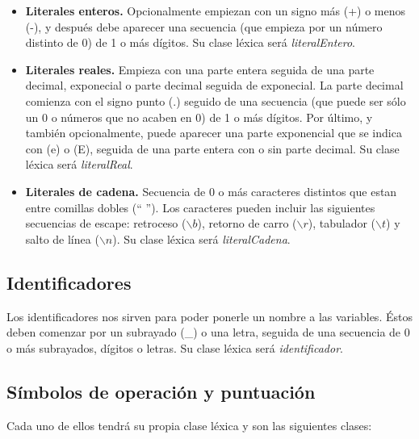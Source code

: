 \begin{itemize}
    \item \textbf{Literales enteros.} Opcionalmente empiezan con un signo más (+) o menos (-), y después debe aparecer una
        secuencia (que empieza por un número distinto de 0) de 1 o más dígitos. Su clase léxica será \textit{literalEntero}.
    \item \textbf{Literales reales.} Empieza con una parte entera seguida de una parte decimal, exponecial o parte decimal seguida de exponecial. La parte decimal comienza con el signo punto (.) seguido de una secuencia (que puede ser sólo un 0 o números que no acaben en 0) de 1 o más dígitos. Por último, y también opcionalmente, puede aparecer una parte exponencial que se indica con (e) o (E), seguida de una parte entera con o sin parte decimal. Su clase léxica será \textit{literalReal}.
    \item \textbf{Literales de cadena.} Secuencia de 0 o más caracteres distintos que estan entre comillas dobles (`` ''). Los caracteres pueden incluir las siguientes secuencias de
    escape: retroceso ($\backslash{b}$), retorno de carro ($\backslash{r}$), tabulador ($\backslash{t}$) y salto de línea ($\backslash{n}$). Su clase léxica será \textit{literalCadena}.
\end{itemize}

\subsection{Identificadores}

Los identificadores nos sirven para poder ponerle un nombre a las variables. Éstos deben comenzar por un subrayado (\_) o una letra, seguida de una secuencia de 0 o más
subrayados, dígitos o letras. Su clase léxica será \textit{identificador}.

\subsection{Símbolos de operación y puntuación}

Cada uno de ellos tendrá su propia clase léxica y son las siguientes clases:

